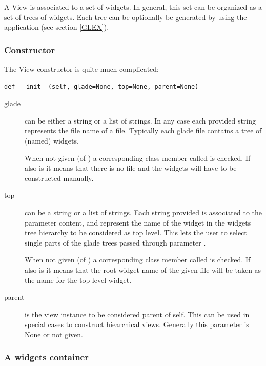 A View is associated to a set of widgets. In general, this set
can be organized as a set of trees of widgets. Each tree can be
optionally be generated by using the \glade application 
(see section \ref{GLEX}). 


\subsubsection{Constructor}

The View constructor is quite much complicated:

{ \codesize 
\begin{verbatim} 
def __init__(self, glade=None, top=None, parent=None)
\end{verbatim}} 


\begin{description}
\item[glade] can be either a string or a list of strings. In
  any case each provided string represents the file name of a \glade
  file. Typically each glade file contains a tree of (named) widgets.
   
  When not given (of ) a corresponding class member
  called  is checked. If also 
  is  it means that there is no \glade file and the
  widgets will have to be constructed manually.
  
\item[top] can be a string or a list of strings.  Each string
  provided is associated to the parameter  content,
  and represent the name of the widget in the widgets tree
  hierarchy to be considered as top level. This lets the user to
  select single parts of the glade trees passed through parameter
  . 

  When not given (of ) a corresponding class member
  called  is checked. If also  is
   it means that the root widget name of the given
  \glade file will be taken as the name for the top level widget.

\item[parent] is the view instance to be considered parent of
  self. This can be used in special cases to construct hiearchical
  views. Generally this parameter is None or not given.

\end{description}


\subsubsection{\label{VIEW:MANUAL}A widgets container}

